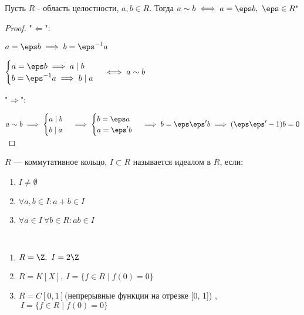 \begin{lemma}
    Пусть $R$ - область целостности, $a, b \in R$. Тогда $a \sim b \iff a = \eps b,~\eps \in R^*$
\end{lemma}

\begin{proof}

    "$\Leftarrow$":

    $a = \eps b \implies b = \eps^{-1} a$
    
    $\begin{cases}
        a = \eps b \implies a \mid b\\
        b = \eps^{-1} a \implies b \mid a
    \end{cases} \iff a \sim b$

    "$\Rightarrow$": 

    $a \sim b \implies \begin{cases}
        a \mid b\\
        b \mid a
    \end{cases} \implies \begin{cases}
        b = \eps a\\
        a = \eps' b
    \end{cases} \implies b = \eps \eps' b \implies (\eps \eps' - 1) b = 0$
\end{proof}

\begin{defn}    
    $R$ --- коммутативное кольцо, $I \subset R$ называется идеалом в $R$, если:

    \begin{enumerate}
        \item $I \neq \emptyset$
        
        \item $\forall a, b \in I: a + b \in I$
        
        \item $\forall a \in I~\forall b \in R: ab \in I$
    \end{enumerate}
\end{defn}

\begin{examples}~

    \begin{enumerate}
        \item $R = \Z,~I = 2\Z$
        
        \item $R = K[X],~I = \{ f \in R \mid f(0) = 0 \}$
        
        \item $R = C[0, 1]$(непрерывные функции на отрезке [0, 1]) ,$~I = \{ f \in R \mid f(0) = 0 \}$
    \end{enumerate}
\end{examples}

